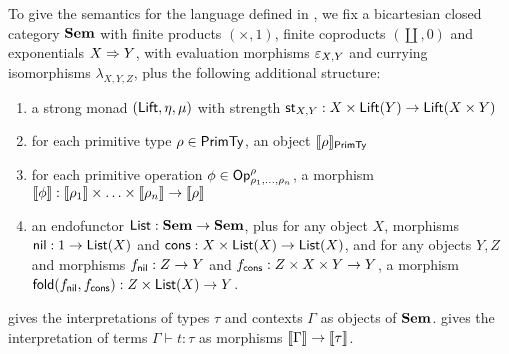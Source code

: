 To give the semantics for the language defined in , we fix a bicartesian closed
category $\mathbf{Sem}$ with finite products $(\times, 1)$, finite coproducts $(\coprod, 0)$ and exponentials
$X \Rightarrow Y$, with evaluation morphisms $\varepsilon_{X,Y}$ and currying isomorphisms $\lambda_{X,Y,Z}$,
plus the following additional structure:
\begin{enumerate}
\item a strong monad $(\mathsf{Lift}, \eta, \mu)$ with strength $\mathsf{st}_{X,Y}: X \times \mathsf{Lift}(Y) \to \mathsf{Lift}(X
\times Y)$
\item for each primitive type $\rho \in \mathsf{PrimTy}$, an object $\llbracket \rho \rrbracket_{\mathsf{PrimTy}}$
\item for each primitive operation $\phi \in \mathsf{Op}^\rho_{\rho_1,\ldots,\rho_n}$, a morphism $\llbracket \phi \rrbracket:
\llbracket \rho_1 \rrbracket \times \ldots \times \llbracket \rho_n \rrbracket \to \llbracket \rho \rrbracket$
\item an endofunctor $\mathsf{List}: \mathbf{Sem} \to \mathbf{Sem}$, plus for any object $X$, morphisms $\mathsf{nil}: 1 \to \mathsf{List}(X)$ and
$\mathsf{cons}: X \times \mathsf{List}(X) \to \mathsf{List}(X)$, and for any objects $Y, Z$ and morphisms $f_{\mathsf{nil}}: Z \to Y$ and
$f_{\mathsf{cons}}: Z \times X \times Y \to Y$, a morphism $\mathsf{fold}(f_{\mathsf{nil}},f_{\mathsf{cons}}): Z \times \mathsf{List}(X) \to Y$.
\end{enumerate}

 gives the interpretations of types $\tau$ and contexts $\Gamma$ as objects of $\mathbf{Sem}$.
 gives the interpretation of terms $\Gamma \vdash t: \tau$ as morphisms $\llbracket \Gamma \rrbracket
\to \llbracket \tau \rrbracket$.
